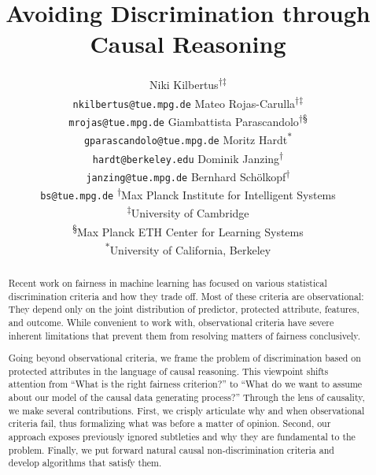 \documentclass{article}
\author{
Niki Kilbertus\textsuperscript{$\dagger$}\textsuperscript{$\ddagger$}\\
\texttt{nkilbertus@tue.mpg.de}
\And
Mateo Rojas-Carulla\textsuperscript{$\dagger$}\textsuperscript{$\ddagger$}\\
\texttt{mrojas@tue.mpg.de}
\And
Giambattista Parascandolo\textsuperscript{$\dagger$}\textsuperscript{\S}\\
\texttt{gparascandolo@tue.mpg.de}
\AND
Moritz Hardt\textsuperscript{$\ast$}\\
\texttt{hardt@berkeley.edu}
\And
Dominik Janzing\textsuperscript{$\dagger$}\\
\texttt{janzing@tue.mpg.de}
\And
Bernhard Sch\"olkopf\textsuperscript{$\dagger$}\\
\texttt{bs@tue.mpg.de}
\AND
\normalfont
\normalsize\textsuperscript{$\dagger$}Max Planck Institute for Intelligent Systems\\
\normalsize\textsuperscript{$\ddagger$}University of Cambridge\\
\normalsize\textsuperscript{\S}Max Planck ETH Center for Learning Systems\\
\normalsize\textsuperscript{$\ast$}University of California, Berkeley
}
\title{Avoiding Discrimination through Causal Reasoning}
\begin{document}
\maketitle

\begin{abstract}
  Recent work on fairness in machine learning has focused on various statistical
  discrimination criteria and how they trade off. Most of these criteria are
  observational: They depend only on the joint distribution of predictor,
  protected attribute, features, and outcome. While convenient to work with,
  observational criteria have severe inherent limitations that prevent them from
  resolving matters of fairness conclusively.

  Going beyond observational criteria, we frame the problem of discrimination
  based on protected attributes in the language of causal reasoning. This
  viewpoint shifts attention from ``What is the right fairness criterion?'' to
  ``What do we want to assume about our model of the causal data generating process?''
  Through the lens of causality, we make several contributions. First, we
  crisply articulate why and when observational criteria fail, thus formalizing
  what was before a matter of opinion. Second, our approach exposes previously
  ignored subtleties and why they are fundamental to the problem. Finally, we
  put forward natural causal non-discrimination criteria and develop algorithms
  that satisfy them.
\end{abstract}







\clearpage{}
\printbibliography[title={References}]

\clearpage{}

\end{document}
